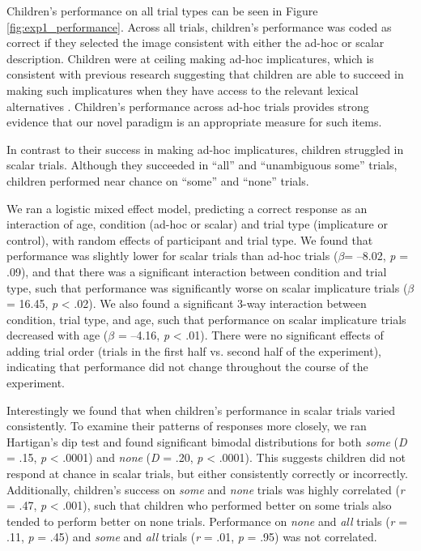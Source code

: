 \documentclass[man]{apa2}
\begin{document}
Children's performance on all trial types can be seen in Figure \ref{fig:exp1_performance}. Across all trials, children's performance was coded as correct if they selected the image consistent with either the ad-hoc or scalar description. Children were at ceiling making ad-hoc implicatures, which is consistent with previous research suggesting that children are able to succeed in making such implicatures when they have access to the relevant lexical alternatives \cite{Stiller2014}. Children's performance across ad-hoc trials provides strong evidence that our novel paradigm is an appropriate measure for such items.

In contrast to their success in making ad-hoc implicatures, children struggled in scalar trials. Although they succeeded in ``all'' and ``unambiguous some'' trials, children performed near chance on ``some'' and ``none'' trials. 

We ran a logistic mixed effect model, predicting a correct response as an interaction of age, condition (ad-hoc or scalar) and trial type (implicature or control), with random effects of participant and trial type. We found that performance was slightly lower for scalar trials than ad-hoc trials ($\beta$= --8.02, \textit{p} = .09), and that there was a significant interaction between condition and trial type, such that performance was significantly worse on scalar implicature trials ($\beta$= 16.45, \textit{p} < .02). We also found a significant 3-way interaction between condition, trial type, and age, such that performance on scalar implicature trials decreased with age ($\beta$ = --4.16, \textit{p} < .01). There were no significant effects of adding trial order (trials in the first half vs. second half of the experiment), indicating that performance did not change throughout the course of the experiment. 

Interestingly we found that when children's performance in scalar trials varied consistently. To examine their patterns of responses more closely, we ran Hartigan's dip test and found significant bimodal distributions for both \textit{some} (\textit{D} = .15, \textit{p} < .0001) and \textit{none} (\textit{D} = .20, \textit{p} < .0001). This suggests children did not respond at chance in scalar trials, but either consistently correctly or incorrectly. Additionally, children's success on \textit{some} and \textit{none} trials was highly correlated (\textit{r} = .47, \textit{p} < .001), such that children who performed better on some trials also tended to perform better on none trials.  Performance on \textit{none} and \textit{all} trials (\textit{r} = .11, \textit{p} = .45) and \textit{some} and \textit{all} trials (\textit{r} = .01, \textit{p} = .95) was not correlated. 
\end{document}
